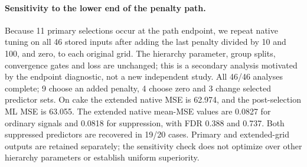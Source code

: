 \paragraph{Sensitivity to the lower end of the penalty path.}
Because 11 primary selections occur at the path endpoint, we repeat native tuning on all 46 stored inputs after adding the last penalty divided by 10 and 100, and zero, to each original grid. The hierarchy parameter, group splits, convergence gates and loss are unchanged; this is a secondary analysis motivated by the endpoint diagnostic, not a new independent study. All 46/46 analyses complete; 9 choose an added penalty, 4 choose zero and 3 change selected predictor sets. On cake the extended native MSE is 62.974, and the post-selection ML MSE is 63.055. The extended native mean-MSE values are 0.0827 for ordinary signals and 0.0818 for suppression, with FDR 0.388 and 0.737. Both suppressed predictors are recovered in 19/20 cases. Primary and extended-grid outputs are retained separately; the sensitivity check does not optimize over other hierarchy parameters or establish uniform superiority.
